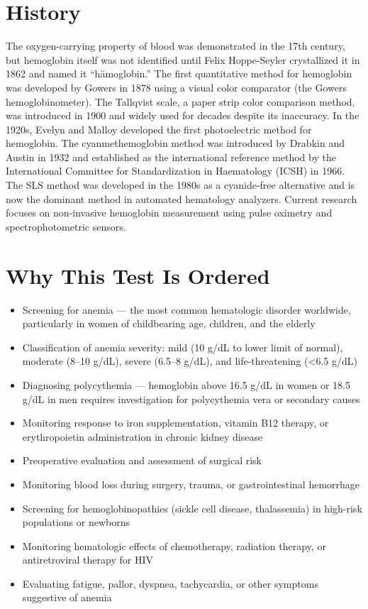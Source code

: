 \section*{History}
The oxygen-carrying property of blood was demonstrated in the 17th century, but hemoglobin itself was not identified until Felix Hoppe-Seyler crystallized it in 1862 and named it ``h\"{a}moglobin.'' The first quantitative method for hemoglobin was developed by Gowers in 1878 using a visual color comparator (the Gowers hemoglobinometer). The Tallqvist scale, a paper strip color comparison method, was introduced in 1900 and widely used for decades despite its inaccuracy. In the 1920s, Evelyn and Malloy developed the first photoelectric method for hemoglobin. The cyanmethemoglobin method was introduced by Drabkin and Austin in 1932 and established as the international reference method by the International Committee for Standardization in Haematology (ICSH) in 1966. The SLS method was developed in the 1980s as a cyanide-free alternative and is now the dominant method in automated hematology analyzers. Current research focuses on non-invasive hemoglobin measurement using pulse oximetry and spectrophotometric sensors.

\section*{Why This Test Is Ordered}
\begin{itemize}
  \item Screening for anemia --- the most common hematologic disorder worldwide, particularly in women of childbearing age, children, and the elderly
  \item Classification of anemia severity: mild (10 g/dL to lower limit of normal), moderate (8--10 g/dL), severe (6.5--8 g/dL), and life-threatening (<6.5 g/dL)
  \item Diagnosing polycythemia --- hemoglobin above 16.5 g/dL in women or 18.5 g/dL in men requires investigation for polycythemia vera or secondary causes
  \item Monitoring response to iron supplementation, vitamin B12 therapy, or erythropoietin administration in chronic kidney disease
  \item Preoperative evaluation and assessment of surgical risk
  \item Monitoring blood loss during surgery, trauma, or gastrointestinal hemorrhage
  \item Screening for hemoglobinopathies (sickle cell disease, thalassemia) in high-risk populations or newborns
  \item Monitoring hematologic effects of chemotherapy, radiation therapy, or antiretroviral therapy for HIV
  \item Evaluating fatigue, pallor, dyspnea, tachycardia, or other symptoms suggestive of anemia
\end{itemize}

